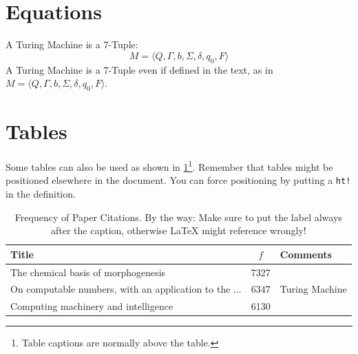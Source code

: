 




\section{Equations}
A Turing Machine is a 7-Tuple:
\begin{equation}
    M = \langle Q, \Gamma, b, \Sigma, \delta, q_0, F \rangle
\end{equation}
A Turing Machine is a 7-Tuple even if defined in the text, as in $M = \langle Q, \Gamma, b, \Sigma, \delta, q_0, F \rangle$.




\section{Tables}
Some tables can also be used as shown in \cref{tab:table}\footnote{Table captions are normally above the table.}. Remember that tables might be positioned elsewhere in the document. You can force positioning by putting a \texttt{ht!} in the definition.

\begin{table}[ht!]
\centering
\caption{Frequency of Paper Citations. By the way: Make sure to put the label always after the caption, otherwise \LaTeX{} might reference wrongly!}
\begin{tabular}{lcl} \toprule
Title&$f$&Comments\\ \midrule
The chemical basis of morphogenesis & 7327 & \\ 
On computable numbers, with an application to the ... & 6347 & Turing Machine\\
Computing machinery and intelligence & 6130 & \\ \bottomrule
\end{tabular}
\label{tab:table}
\end{table}




